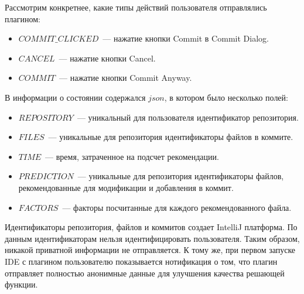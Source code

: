 Рассмотрим конкретнее, какие типы действий пользователя отправлялись плагином:
    \begin{itemize}
        \item $COMMIT\_CLICKED$~--- нажатие кнопки Commit в Commit Dialog.
        \item $CANCEL$~--- нажатие кнопки Cancel.
        \item $COMMIT$~--- нажатие кнопки Commit Anyway.
    \end{itemize}

В информации о состоянии содержался $json$, в котором было несколько полей:
    \begin{itemize}
        \item $REPOSITORY$~--- уникальный для пользователя идентификатор репозитория.
        \item $FILES$~--- уникальные для репозитория идентификаторы файлов в коммите.
        \item $TIME$~--- время, затраченное на подсчет рекомендации.
        \item $PREDICTION$~--- уникальные для репозитория идентификаторы файлов, рекомендованные для модификации и добавления в коммит.
        \item $FACTORS$~--- факторы посчитанные для каждого рекомендованного файла.
    \end{itemize}
Идентификаторы репозитория, файлов и коммитов создает IntelliJ платформа. По данным идентификаторам нельзя идентифицировать пользователя. Таким образом, никакой приватной информации не отправляется. К тому же, при первом запуске IDE с плагином пользователю показывается нотификация о том, что плагин отправляет полностью анонимные данные для улучшения качества решающей функции.
